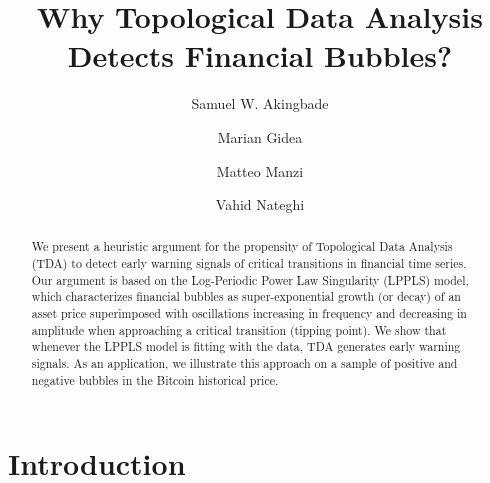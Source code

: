 \documentclass[11pt]{amsart}
\theoremstyle{definition}
\theoremstyle{remark}
\numberwithin{equation}{section}
\begin{document}
\title[Why TDA Detects Financial Bubbles?]{Why Topological Data Analysis Detects Financial Bubbles?}

\author[S. W. Akingbade]{Samuel W. Akingbade}
\address{Department of Mathematical Sciences, Yeshiva University, USA}

\author[M. Gidea]{Marian Gidea}
\address{Department of Mathematical Sciences, Yeshiva University, USA}

\author[M. Manzi]{Matteo Manzi}
\address{CrunchDAO, France}

\author[V. Nateghi]{Vahid Nateghi}
\address{Aerospace Sciences and Technology Department, Politecnico di Milano, Italy}


\begin{abstract}
We present a heuristic argument for the propensity of  Topological Data Analysis (TDA) to detect early warning signals of critical transitions in financial time series.
Our argument is based on the Log-Periodic Power Law Singularity  (LPPLS) model,  which characterizes financial bubbles as super-exponential growth (or decay) of an asset price superimposed with oscillations increasing in frequency and decreasing in amplitude when approaching a critical transition (tipping point).  We show that whenever the LPPLS model is fitting with the data, TDA  generates early warning signals. As an application, we illustrate this approach on a sample of positive and negative bubbles in the Bitcoin historical price.
\end{abstract}

\maketitle
\section{Introduction}
\end{document}
